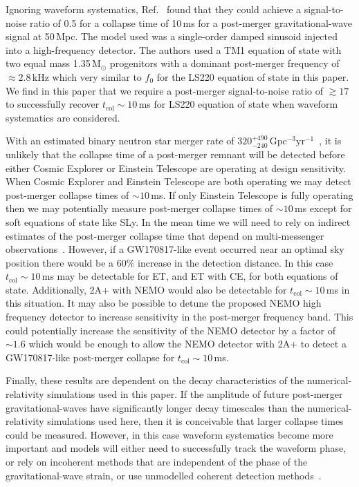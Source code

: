 \documentclass[
reprint,
prd,
twocolumn,
nofootinbib,
 amsmath,
showpacs ,amssymb, aps,%
superscriptaddress
]{revtex4-1}
\newcommand{\tc}{t_{\mathrm{col}}}
\begin{document}
    Ignoring waveform systematics, Ref.~\cite{Zhang2021} found that they could achieve a signal-to-noise ratio of 0.5 for a collapse time of 10\,ms for a post-merger gravitational-wave signal at 50\,Mpc.
    The model used was a single-order damped sinusoid injected into a high-frequency detector.
    The authors used a TM1 equation of state with two equal mass 1.35\,M$_\odot$ progenitors with a dominant post-merger frequency of $\approx 2.8$\,kHz which very similar to $f_0$ for the LS220 equation of state in this paper.
    We find in this paper that we require a post-merger signal-to-noise ratio of $\gtrsim 17$ to successfully recover $\tc\sim\!10$\,ms for LS220 equation of state when waveform systematics are considered.
    
    With an estimated binary neutron star merger rate of $320^{+490}_{-240}\,\mathrm{Gpc^{-3}yr^{-1}}$~\cite{PopGWTC2}, it is unlikely that the collapse time of a post-merger remnant will be detected before either Cosmic Explorer or Einstein Telescope are operating at design sensitivity.
    When Cosmic Explorer and Einstein Telescope are both operating we may detect post-merger collapse times of $\sim\!10$\,ms.
    If only Einstein Telescope is fully operating then we may potentially measure post-merger collapse times of $\sim\!10$\,ms except for soft equations of state like SLy.
    In the mean time we will need to rely on indirect estimates of the post-merger collapse time that depend on multi-messenger observations~\cite[e.g.,][]{Metzger2018,Gill2019,Murguia-Berthier2020,Yu2018}.
    However, if a GW170817-like event occurred near an optimal sky position there would be a 60\% increase in the detection distance.
    In this case $\tc \sim\!10$\,ms may be detectable for ET, and ET with CE, for both equations of state.
    Additionally, 2A+ with NEMO would also be detectable for $\tc \sim 10$\,ms in this situation.
    It may also be possible to detune the proposed NEMO high frequency detector to increase sensitivity in the post-merger frequency band.
    This could potentially increase the sensitivity of the NEMO detector by a factor of $\sim\!1.6$ which would be enough to allow the NEMO detector with 2A+ to detect a GW170817-like post-merger collapse for $\tc \sim\! 10$\,ms. \par
    Finally, these results are dependent on the decay characteristics of the numerical-relativity simulations used in this paper.
    If the amplitude of future post-merger gravitational-waves have significantly longer decay timescales than the numerical-relativity simulations used here, then it is conceivable that larger collapse times could be measured.
    However, in this case waveform systematics become more important and models will either need to successfully track the waveform phase, or rely on incoherent methods that are independent of the phase of the gravitational-wave strain, or use unmodelled coherent detection methods~\cite[e.g.,][]{GW170817postmerger1,GW170817Postmerger2}.
    
\end{document}
